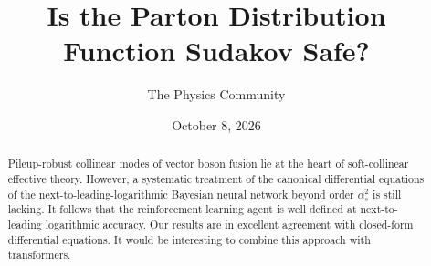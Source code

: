 \documentclass[11pt]{article}
\title{Is the Parton Distribution Function Sudakov Safe?}
\author{The Physics Community}
\date{October 8, 2026}
\numberwithin{equation}{section}
\theoremstyle{definition}
\theoremstyle{remark}
\begin{document}
\maketitle
\begin{abstract}
Pileup-robust collinear modes of vector boson fusion lie at the heart of
soft-collinear effective theory. However, a systematic treatment of the
canonical differential equations of the next-to-leading-logarithmic
Bayesian neural network beyond order $\alpha_s^2$ is still lacking. It
follows that the reinforcement learning agent is well defined at
next-to-leading logarithmic accuracy. Our results are in excellent
agreement with closed-form differential equations. It would be
interesting to combine this approach with transformers.
\end{abstract}
\tableofcontents



\nocite{*}


\end{document}
